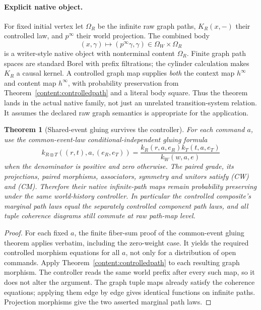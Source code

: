 \documentclass[11pt]{article}
\newtheorem{theorem}{Theorem}[section]
\begin{document}
\paragraph{Explicit native object.} For fixed initial vertex let $\Omega_R$ be the infinite raw graph paths, $K_R(x,-)$ their controlled law, and $p^\infty$ their world projection. The combined body
\[
 (x,\gamma)\longmapsto(p^\infty\gamma,\gamma)
       \in\Omega_W\times\Omega_R
\]
is a writer-style native object with nonterminal content $\Omega_R$. Finite graph path spaces are standard Borel with prefix filtrations; the cylinder calculation makes $K_R$ a causal kernel. A controlled graph map supplies \emph{both} the context map $h^\infty$ and content map $h^\infty$, with probability preservation from Theorem~\ref{content:controlledpath} and a literal body square. Thus the theorem lands in the actual native family, not just an unrelated transition-system relation. It assumes the declared raw graph semantics is appropriate for the application.

\begin{theorem}[Shared-event gluing survives the controller]\label{content:controlledtensor}
For each command $a$, use the common-event-law conditional-independent gluing formula
\[
 k_{R\otimes T}((r,t),a,(e_R,e_T))
 =\frac{k_R(r,a,e_R)k_T(t,a,e_T)}{k_W(w,a,e)}
\]
when the denominator is positive and zero otherwise. The paired grade, its projections, paired morphisms, associators, symmetry and unitors satisfy (CW) and (CM). Therefore their native infinite-path maps remain probability preserving under the same world-history controller. In particular the controlled composite's marginal path laws equal the separately controlled component path laws, and all tuple coherence diagrams still commute at raw path-map level.
\end{theorem}
\begin{proof}
For each fixed $a$, the finite fiber-sum proof of the common-event gluing theorem applies verbatim, including the zero-weight case. It yields the required controlled morphism equations for all $a$, not only for a distribution of open commands. Apply Theorem~\ref{content:controlledpath} to each resulting graph morphism. The controller reads the same world prefix after every such map, so it does not alter the argument. The graph tuple maps already satisfy the coherence equations; applying them edge by edge gives identical functions on infinite paths. Projection morphisms give the two asserted marginal path laws.
\end{proof}
\end{document}

